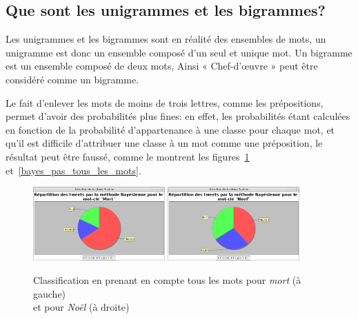 \documentclass[12pt,a4paper]{report}
\begin{document}
\subsection{Que sont les unigrammes et les bigrammes?}
Les unigrammes et les bigrammes sont en réalité des ensembles de mots, un
unigramme est donc un ensemble composé d'un seul et unique mot. Un bigramme est
un ensemble composé de deux mots, Ainsi « Chef-d'œuvre » peut être considéré
comme un bigramme.

Le fait d'enlever les mots de moins de trois lettres, comme les prépositions,
permet d'avoir des probabilités plus fines: en effet, les probabilités étant
calculées en fonction de la probabilité d'appartenance à une classe pour chaque
mot, et qu'il est difficile d'attribuer une classe à un mot comme une
préposition, le résultat peut être faussé, comme le montrent les
figures~\ref{bayes_tous_les_mots} et~\ref{bayes_pas_tous_les_mots}.

\begin{figure}
	\centering
	\includegraphics[width=0.45\textwidth]{img/classificationMortBayesTouslesMots.png}
	\includegraphics[width=0.45\textwidth]{img/classificationtouslesmotsnoel.png}
	\caption{Classification en prenant en compte tous les mots pour
	\textit{mort} (à gauche)\\et pour \textit{Noël} (à droite)}
	\label{bayes_tous_les_mots}
\end{figure}
\end{document}
